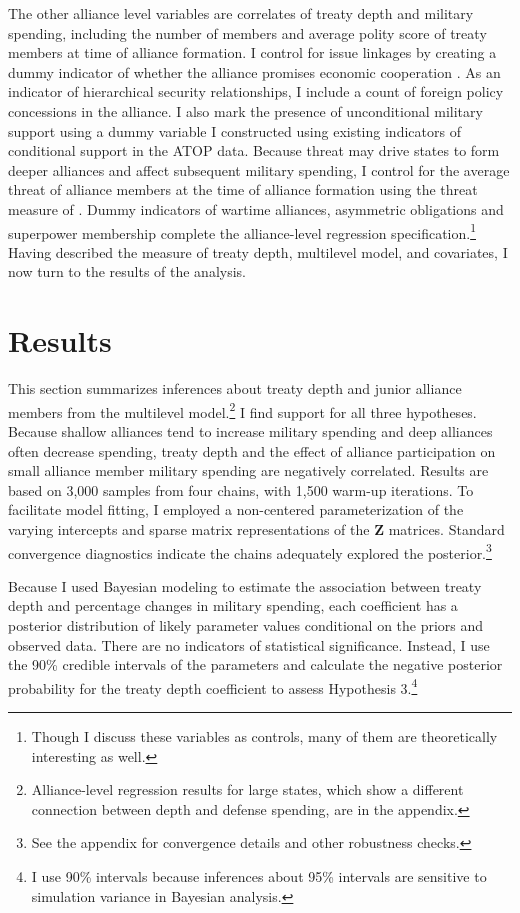 \documentclass[12pt]{article}
\begin{document}
 
The other alliance level variables are correlates of treaty depth and military spending, including the number of members and average polity score of treaty members at time of alliance formation. 
I control for issue linkages by creating a dummy indicator of whether the alliance promises economic cooperation \citep{Poast2013, LongLeeds2006}. 
As an indicator of hierarchical security relationships, I include a count of foreign policy concessions in the alliance. 
I also mark the presence of unconditional military support using a dummy variable I constructed using existing indicators of conditional support in the ATOP data. 
Because threat may drive states to form deeper alliances and affect subsequent military spending, I control for the average threat of alliance members at the time of alliance formation using the threat measure of \citet{LeedsSavun2007}. 
Dummy indicators of wartime alliances, asymmetric obligations \citep{Leedsetal2002} and superpower membership complete the alliance-level regression specification.\footnote{Though I discuss these variables as controls, many of them are theoretically interesting as well.}  
Having described the measure of treaty depth, multilevel model, and covariates, I now turn to the results of the analysis. 

 

\section{Results}


This section summarizes inferences about treaty depth and junior alliance members from the multilevel model.\footnote{Alliance-level regression results for large states, which show a different connection between depth and defense spending, are in the appendix.}
I find support for all three hypotheses. 
Because shallow alliances tend to increase military spending and deep alliances often decrease spending, treaty depth and the effect of alliance participation on small alliance member military spending are negatively correlated. 
Results are based on 3,000 samples from four chains, with 1,500 warm-up iterations. 
To facilitate model fitting, I employed a non-centered parameterization of the varying intercepts and sparse matrix representations of the \textbf{Z} matrices. 
Standard convergence diagnostics indicate the chains adequately explored the posterior.\footnote{See the appendix for convergence details and other robustness checks.} 


Because I used Bayesian modeling to estimate the association between treaty depth and percentage changes in military spending, each coefficient has a posterior distribution of likely parameter values conditional on the priors and observed data.
There are no indicators of statistical significance. 
Instead, I use the 90\% credible intervals of the parameters and calculate the negative posterior probability for the treaty depth coefficient to assess Hypothesis 3.\footnote{I use 90\% intervals because inferences about 95\% intervals are sensitive to simulation variance in Bayesian analysis.}
\end{document}
